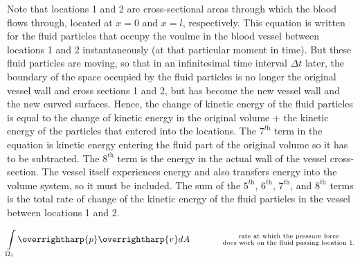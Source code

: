 \documentclass[12pt, a4paper]{article}
\theoremstyle{definition}
\theoremstyle{remark}
\theoremstyle{definition}
\newcommand*{\vtr}[1]{\text{\overrightharp{\ensuremath{#1}}}}
\renewcommand{\u}[1]{\underline{\smash{#1}}}
\newcommand{\?}{\stackrel{?}{=}}
\renewcommand{\it}[1]{\textit{#1}}
\begin{document}
Note that locations 1 and 2 are cross-sectional areas through which the blood flows through, located at $x=0$ and $x=l$, respectively. 
This equation is written for the fluid particles that occupy the voulme in the blood vessel between locations 1 and 2 instantaneously (at that particular moment in time). But these fluid particles are moving, so that in an infinitesimal time interval $\Delta t$ later, the boundary of the space occupied by the fluid particles is no longer the original vessel wall and cross sections 1 and 2, but has become the new vessel wall and the new curved surfaces. Hence, the change of kinetic energy  of the fluid particles is equal to the change of kinetic energy in the original volume + the kinetic energy of the particles that entered into the locations. The ${7}^{\it{th}}$ term in the equation is kinetic energy entering the fluid \u{not} part of the original volume so it has to be subtracted. The ${8}^{\it{th}}$  term is the energy in the actual wall of the vessel cross-section. The vessel itself experiences energy and also transfers energy into the volume system, so it must be included. The sum of the ${5}^{\it{th}}$, ${6}^{\it{th}}$, ${7}^{\it{th}}$, and ${8}^{\it{th}}$ terms is the total rate of change of the kinetic energy of the fluid particles in the vessel between locations 1 and 2. 

\begin{align}
 \int\limits_{{\Omega}_{1}} \vtr{p} \vtr{v} dA \hspace{0.5in} \substack{\text{rate at which the pressure force} \\ \text{does work on the fluid passing location 1.}}
\end{align}
\end{document}
